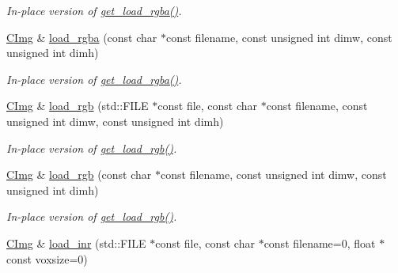 \begin{DoxyCompactItemize}
\begin{DoxyCompactList}\small\item\em In-\/place version of \hyperlink{structcimg__library_1_1_c_img_aed4dc2820c667c07afcc3e362c23c117}{get\_\-load\_\-rgba()}. \item\end{DoxyCompactList}\item 
\hypertarget{structcimg__library_1_1_c_img_a541f2384cc851c5fb5777d173ac9fb47}{
\hyperlink{structcimg__library_1_1_c_img}{CImg} \& \hyperlink{structcimg__library_1_1_c_img_a541f2384cc851c5fb5777d173ac9fb47}{load\_\-rgba} (const char $\ast$const filename, const unsigned int dimw, const unsigned int dimh)}
\label{structcimg__library_1_1_c_img_a541f2384cc851c5fb5777d173ac9fb47}

\begin{DoxyCompactList}\small\item\em In-\/place version of \hyperlink{structcimg__library_1_1_c_img_aed4dc2820c667c07afcc3e362c23c117}{get\_\-load\_\-rgba()}. \item\end{DoxyCompactList}\item 
\hypertarget{structcimg__library_1_1_c_img_a8af2bb2b31a1ccaf8b73f7cce7c37709}{
\hyperlink{structcimg__library_1_1_c_img}{CImg} \& \hyperlink{structcimg__library_1_1_c_img_a8af2bb2b31a1ccaf8b73f7cce7c37709}{load\_\-rgb} (std::FILE $\ast$const file, const char $\ast$const filename, const unsigned int dimw, const unsigned int dimh)}
\label{structcimg__library_1_1_c_img_a8af2bb2b31a1ccaf8b73f7cce7c37709}

\begin{DoxyCompactList}\small\item\em In-\/place version of \hyperlink{structcimg__library_1_1_c_img_a2f381d7d76854210ea6dff9db18c7f79}{get\_\-load\_\-rgb()}. \item\end{DoxyCompactList}\item 
\hypertarget{structcimg__library_1_1_c_img_a830febfc2298d7a33503b77a7efcde59}{
\hyperlink{structcimg__library_1_1_c_img}{CImg} \& \hyperlink{structcimg__library_1_1_c_img_a830febfc2298d7a33503b77a7efcde59}{load\_\-rgb} (const char $\ast$const filename, const unsigned int dimw, const unsigned int dimh)}
\label{structcimg__library_1_1_c_img_a830febfc2298d7a33503b77a7efcde59}

\begin{DoxyCompactList}\small\item\em In-\/place version of \hyperlink{structcimg__library_1_1_c_img_a2f381d7d76854210ea6dff9db18c7f79}{get\_\-load\_\-rgb()}. \item\end{DoxyCompactList}\item 
\hypertarget{structcimg__library_1_1_c_img_aea6912707c7840909881ab1e58c5878f}{
\hyperlink{structcimg__library_1_1_c_img}{CImg} \& \hyperlink{structcimg__library_1_1_c_img_aea6912707c7840909881ab1e58c5878f}{load\_\-inr} (std::FILE $\ast$const file, const char $\ast$const filename=0, float $\ast$const voxsize=0)}
\label{structcimg__library_1_1_c_img_aea6912707c7840909881ab1e58c5878f}


\end{DoxyCompactItemize}

